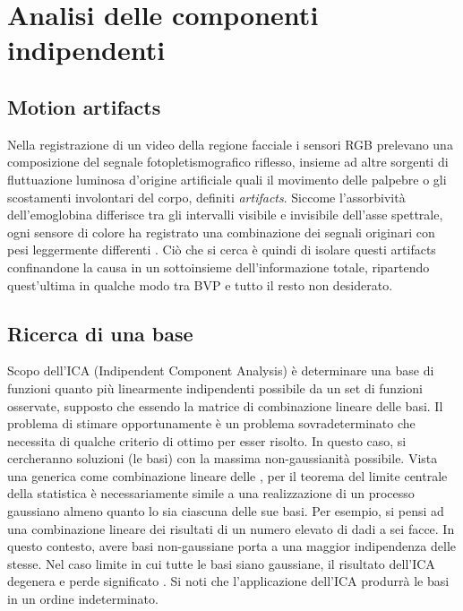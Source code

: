 \section{Analisi delle componenti indipendenti} %
	\subsection{Motion artifacts}
Nella registrazione di un video della regione facciale i sensori RGB prelevano una composizione del segnale fotopletismografico riflesso, insieme ad altre sorgenti di fluttuazione luminosa d’origine artificiale quali il movimento delle palpebre o gli scostamenti involontari del corpo, definiti {\em artifacts}.
Siccome l’assorbività dell’emoglobina differisce tra gli intervalli visibile e invisibile dell’asse spettrale, ogni sensore di colore ha registrato una combinazione dei segnali originari con pesi leggermente differenti \cite{POH11}. Ciò che si cerca è quindi di isolare questi artifacts confinandone la causa in un sottoinsieme dell'informazione totale, ripartendo quest'ultima in qualche modo tra BVP e tutto il resto non desiderato.
	\subsection{Ricerca di una base}
Scopo dell'ICA (Indipendent Component Analysis) è determinare una base di  funzioni quanto più linearmente indipendenti possibile  da un set di  funzioni  osservate, supposto che  essendo  la matrice di combinazione lineare delle basi. Il problema di stimare opportunamente  è un problema sovradeterminato che necessita di qualche criterio di ottimo per esser risolto. In questo caso, si cercheranno soluzioni (le basi) con la massima non-gaussianità possibile. Vista una generica  come combinazione lineare delle , per il teorema del limite centrale della statistica  è necessariamente simile a una realizzazione di un processo gaussiano almeno quanto lo sia ciascuna delle sue basi. Per esempio, si pensi ad una combinazione lineare dei risultati di un numero elevato di dadi a sei facce. In questo contesto, avere basi non-gaussiane porta a una maggior indipendenza delle stesse. Nel caso limite in cui tutte le basi siano gaussiane, il risultato dell'ICA degenera e perde significato \cite{URL:ICA}.
Si noti che l'applicazione dell'ICA produrrà le basi in un ordine indeterminato.